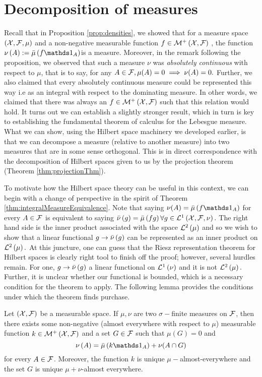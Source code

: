 \section{Decomposition of measures}

Recall that in Proposition \ref{prop:densities}, we showed that for
a measure space $\left(\mathcal{X},\mathcal{F},\mu\right)$ and a non-negative measurable
function $f\in\mathcal{M}^{+}\left(\mathcal{X},\mathcal{F}\right)$ , the function $\nu\left(A\right):=\lebInt{\mu}{f\indicate_{A}}$is
a measure. Moreover, in the remark following the proposition, we observed
that such a measure $\nu$ was \emph{absolutely continuous }with respect
to $\mu$, that is to say, for any $A\in\mathcal{F},\mu(A)=0\implies\nu(A)=0.$
Further, we also claimed that every absolutely continuous measure
could be represented this way i.e as an integral with respect to the
dominating measure. In other words, we claimed that there was always
an $f\in\mathcal{M}^{+}\left(\mathcal{X},\mathcal{F}\right)$ such that this relation would
hold. It turns out we can establish a slightly stronger result, which
in turn is key to establishing the fundamental theorem of calculus
for the Lebesgue measure. What we can show, using the Hilbert space
machinery we developed earlier, is that we can decompose a measure
(relative to another measure) into two measures that are in some sense
orthogonal. This is in direct correspondence with the decomposition
of Hilbert spaces given to us by the projection theorem (Theorem \ref{thm:projectionThm}).

To motivate how the Hilbert space theory can be useful in this context,
we can begin with a change of perspective in the spirit of Theorem
\ref{thm:integralMeasureEquivalence}. Note that saying $\nu(A)=\lebInt{\mu}{f\indicate_{A}}$
for every $A\in\mathcal{F}$ is equivalent to saying $\bar{\nu}\left(g\right)=\bar{\mu}\left(fg\right)\forall g\in\mathcal{L}^{1}\left(\mathcal{X},\mathcal{F},\nu\right).$
The right hand side is the inner product associated with the space
$\mathcal{L}^{2}\left(\mu\right)$ and so we wish to show that a linear functional $g\to\bar{\nu}\left(g\right)$
can be represented as an inner product on $\mathcal{L}^{2}\left(\mu\right).$ At this juncture,
one can guess that the Riesz representation theorem for Hilbert spaces
is clearly right tool to finish off the proof; however, several hurdles
remain. For one, $g\to\bar{\nu}\left(g\right)$ a linear functional on $\mathcal{L}^{1}\left(\nu\right)$
and it is not $\mathcal{L}^{2}\left(\mu\right).$ Further, it is unclear whether our functional
is bounded, which is a necessary condition for the theorem to apply.
The following lemma provides the conditions under which the theorem
finds purchase.
\begin{lem}
\label{lemma:LebesgueRadonNikodym}Let $\left(\mathcal{X},\mathcal{F}\right)$ be a
measurable space. If $\mu,\nu$ are two $\sigma-$finite measures
on $\mathcal{F}$, then there exists some non-negative (almost everywhere with
respect to $\mu$) measurable function $k\in\mathcal{M}^{+}\left(\mathcal{X},\mathcal{F}\right)$
and a set $G\in\mathcal{F}$ such that $\mu(G)=0$ and
\[
\nu\left(A\right)=\lebInt{\mu}{k\indicate_{A}}+\nu(A\cap G)
\]
for every $A\in\mathcal{F}$. Moreover, the function $k$ is unique $\mu-$almost-everywhere
and the set $G$ is unique $\mu+\nu$-almost everywhere.
\end{lem}

